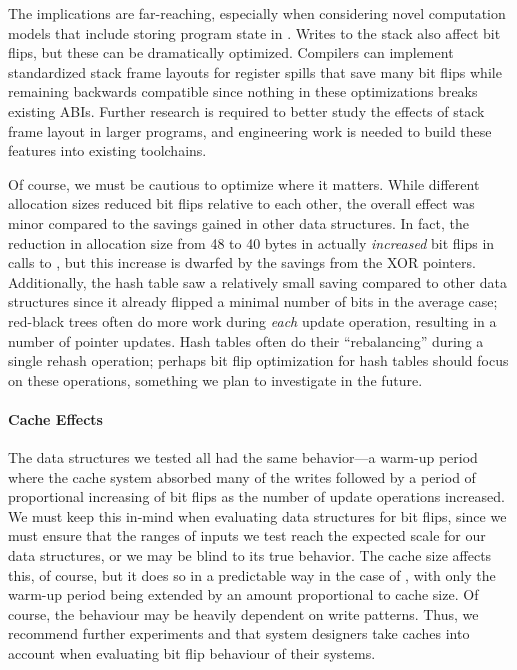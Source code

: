 The implications are far-reaching, especially when considering novel computation
models that include storing program state in \NVM. Writes to the stack also
affect bit flips, but these can be dramatically optimized. Compilers can
implement standardized stack frame layouts for register spills that
save many bit flips while remaining backwards compatible since
nothing in these optimizations breaks existing ABIs. Further research is
required to better study the effects of stack frame layout in larger programs,
and engineering work is needed to build these features into existing toolchains.

Of course, we must be cautious to optimize where it matters. While different
allocation sizes reduced bit flips relative to each other, the overall effect
was minor compared to the savings gained in other data structures. In fact, the
reduction in allocation size from 48 to 40 bytes in \xrbt actually
\textit{increased} bit flips in calls to \malloc, but this increase is
dwarfed by the savings from the XOR pointers. Additionally, the hash table
saw a relatively small saving compared to other data structures since it
already flipped a minimal number of bits in the average case;
red-black trees often do more work during \textit{each} update operation,
resulting in a number of pointer updates. Hash tables often do their
``rebalancing'' during a single rehash operation; perhaps bit flip optimization
for hash tables should focus on these operations, something we plan to
investigate in the future.

\paragraph{Cache Effects}
The data structures we tested all had the same behavior---a warm-up period
where the cache system absorbed many of the writes followed by a period of
proportional increasing of bit flips as the number of update operations
increased. We must
keep this in-mind when evaluating data structures for bit flips, since we must
ensure that the ranges of inputs we test reach the expected scale for
our data structures, or we may be blind to its true behavior.
The cache size affects this, of course, but it does so in a predictable way in
the case of \xrbt, with only the warm-up period being extended by an amount
proportional to cache size. Of course, the behaviour may be heavily dependent on write patterns.
Thus, we recommend further experiments and that system designers take caches into account when
evaluating bit flip behaviour of their systems.

